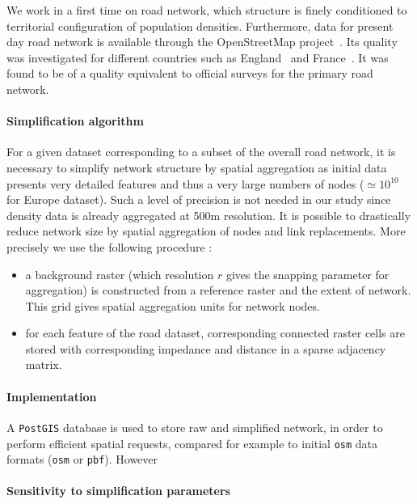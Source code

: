 We work in a first time on road network, which structure is finely conditioned to territorial configuration of population densities. Furthermore, data for present day road network is available through the OpenStreetMap project~\cite{openstreetmap}. Its quality was investigated for different countries such as England~\cite{haklay2010good} and France~\cite{girres2010quality}. It was found to be of a quality equivalent to official surveys for the primary road network.



\paragraph{Simplification algorithm}

For a given dataset corresponding to a subset of the overall road network, it is necessary to simplify network structure by spatial aggregation as initial data presents very detailed features and thus a very large numbers of nodes ($\simeq 10^10$ for Europe dataset). Such a level of precision is not needed in our study since density data is already aggregated at 500m resolution. It is possible to drastically reduce network size by spatial aggregation of nodes and link replacements. More precisely we use the following procedure :
\begin{itemize}
\item a background raster (which resolution $r$ gives the snapping parameter for aggregation) is constructed from a reference raster and the extent of network. This grid gives spatial aggregation units for network nodes.
\item for each feature of the road dataset, corresponding connected raster cells are stored with corresponding impedance and distance in a sparse adjacency matrix.
\end{itemize}


\paragraph{Implementation}

A \texttt{PostGIS} database is used to store raw and simplified network, in order to perform efficient spatial requests, compared for example to initial \texttt{osm} data formats (\texttt{osm} or \texttt{pbf}). However


\paragraph{Sensitivity to simplification parameters}

